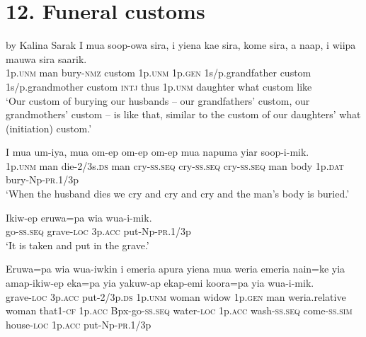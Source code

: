 \section{12. Funeral customs}

 by Kalina Sarak
\ea\label{ex:a:x1}
\gll  I  mua  soop-owa  sira,  i  yiena  kae  sira,                    kome  sira,  a  naap,  i  wiipa  mauwa  sira  saarik. \\
1p.\textsc{unm}  man  bury-\textsc{nmz}  custom  1p.\textsc{unm}  1p.\textsc{gen}  1s/p.grandfather  custom 1s/p.grandmother  custom  \textsc{intj}  thus  1p.\textsc{unm}  daughter  what  custom  like \\


\glt ‘Our custom of burying our husbands – our grandfathers’ custom, our grandmothers’ custom – is like that, similar to the custom of our daughters’ what (initiation) custom.’ \\
\z


\ea\label{ex:a:x2}
\gll  I  mua  um-iya,  mua  om-ep  om-ep  om-ep  mua                    napuma  yiar  soop-i-mik. \\
1p.\textsc{unm}  man  die-2/3s.\textsc{ds}  man  cry-\textsc{ss.seq}  cry-\textsc{ss.seq}  cry-\textsc{ss.seq}  man  body  1p.\textsc{dat}  bury-Np-\textsc{pr}.1/3p \\


\glt ‘When the husband dies we cry and cry and cry and the man’s body is buried.’ \\
\z


\ea\label{ex:a:x3}
\gll  Ikiw-ep  eruwa=pa  wia  wua-i-mik. \\
go-\textsc{ss.seq}  grave-\textsc{loc}  3p.\textsc{acc}  put-Np-\textsc{pr}.1/3p \\
\glt ‘It is taken and put in the grave.’ \\
\z


\ea\label{ex:a:x4}
\gll  Eruwa=pa  wia  wua-iwkin  i  emeria  apura  yiena      mua  weria  emeria  nain=ke  yia  amap-ikiw-ep  eka=pa                  yia  yakuw-ap  ekap-emi  koora=pa  yia  wua-i-mik. \\
grave-\textsc{loc}  3p.\textsc{acc}  put-2/3p.\textsc{ds}  1p.\textsc{unm}  woman  widow  1p.\textsc{gen} man  weria.relative  woman  that1-\textsc{cf}  1p.\textsc{acc}  Bpx-go-\textsc{ss.seq}  water-\textsc{loc}  1p.\textsc{acc}  wash-\textsc{ss.seq}  come-\textsc{ss}.\textsc{sim}  house-\textsc{loc}  1p.\textsc{acc}  put-Np-\textsc{pr}.1/3p \\




